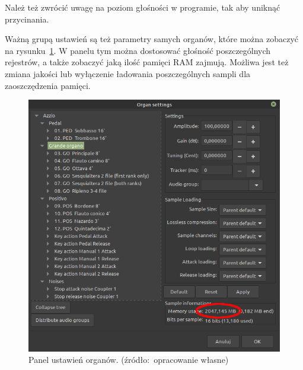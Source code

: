 \documentclass[11pt]{report}
\begin{document}
    Należ też zwrócić uwagę na poziom głośności w programie, tak aby uniknąć przycinania.

    Ważną grupą ustawień są też parametry samych organów, które można zobaczyć na rysunku~\ref{fig:organy}.
    W panelu tym można dostosować głośność poszczególnych rejestrów, a także zobaczyć jaką ilość pamięci RAM zajmują.
    Możliwa jest też zmiana jakości lub wyłączenie ładowania poszczególnych sampli dla zaoszczędzenia pamięci.
    \begin{figure}[!ht]
        \centering
        \includegraphics[width=\linewidth]{fig/organR.png}
        \caption{Panel ustawień organów. (źródło:~opracowanie własne)}
        \label{fig:organy}
    \end{figure}
\end{document}
